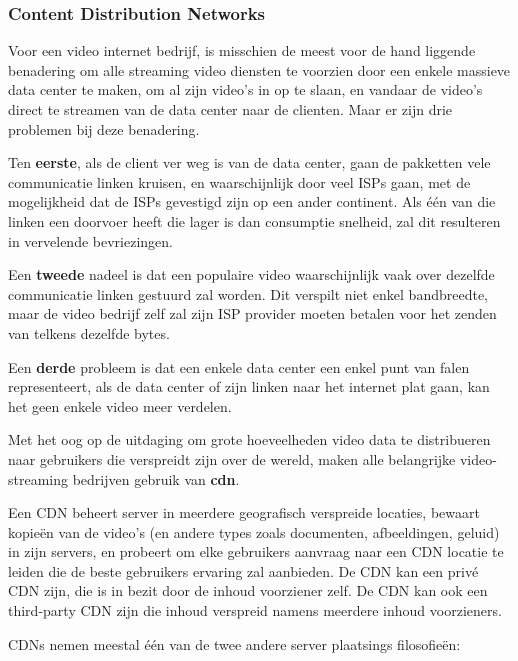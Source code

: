 \newpage

\subsubsection{Content Distribution Networks}

\noindent Voor een video internet bedrijf, is misschien de meest voor de hand liggende benadering om alle streaming video diensten te voorzien door een enkele massieve data center te maken, om al zijn video’s in op te slaan, en vandaar de video’s direct te streamen van de data center naar de clienten. Maar er zijn drie problemen bij deze benadering.

\noindent Ten \textbf{eerste}, als de client ver weg is van de data  center, gaan de pakketten vele communicatie linken kruisen, en waarschijnlijk door veel ISPs gaan, met de mogelijkheid dat de ISPs gevestigd zijn op een ander continent. Als één van die linken een doorvoer heeft die lager is dan consumptie snelheid, zal dit resulteren in vervelende bevriezingen.

\noindent Een \textbf{tweede} nadeel is dat een populaire video waarschijnlijk vaak over dezelfde communicatie linken gestuurd zal worden. Dit verspilt niet enkel bandbreedte, maar de video bedrijf zelf zal zijn ISP provider moeten betalen voor het zenden van telkens dezelfde bytes.

\noindent Een \textbf{derde} probleem is dat een enkele data center een enkel punt van falen representeert, als de data center of zijn linken naar het internet plat gaan, kan het geen enkele video meer verdelen.

\noindent Met het oog op de uitdaging om grote hoeveelheden video data te distribueren naar gebruikers die verspreidt zijn over de wereld, maken alle belangrijke video-streaming bedrijven gebruik van \textbf{\acrfull{cdn}}. 

\noindent Een CDN beheert server in meerdere geografisch verspreide locaties, bewaart kopieën van de video’s (en andere types zoals documenten, afbeeldingen, geluid) in zijn servers, en probeert om elke gebruikers aanvraag naar een CDN locatie te leiden die de beste gebruikers ervaring zal aanbieden. De CDN kan een privé CDN zijn, die is in bezit door de inhoud voorziener zelf. De CDN kan ook een third-party CDN zijn die inhoud verspreid namens meerdere inhoud voorzieners.

\noindent CDNs nemen meestal één van de twee andere server plaatsings filosofieën:

